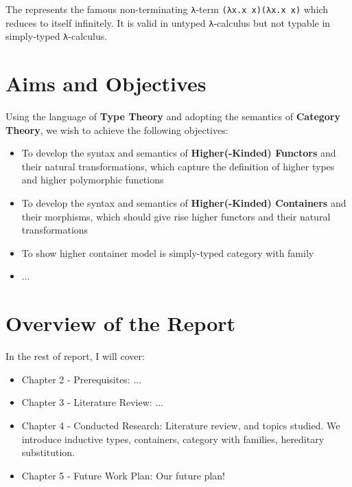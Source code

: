 The  represents the famous non-terminating \texttt{λ}-term \texttt{(λx.x x)(λx.x x)} which reduces to itself infinitely. It is valid in untyped \texttt{λ}-calculus but not typable in simply-typed \texttt{λ}-calculus. 

\section{Aims and Objectives}

Using the language of \textbf{Type Theory} and adopting the semantics of \textbf{Category Theory}, we wish to achieve the following objectives:

\begin{itemize}
  \item{To develop the syntax and semantics of \textbf{Higher(-Kinded) Functors} and their natural transformations, which capture the definition of higher types and higher polymorphic functions}
  \item{To develop the syntax and semantics of \textbf{Higher(-Kinded) Containers} and their morphisms, which should give rise higher functors and their natural transformations}
  \item{To show higher container model is simply-typed category with family}
  \item{...}
\end{itemize}

\section{Overview of the Report}

In the rest of report, I will cover:
\begin{itemize}
  \item{Chapter 2 - Prerequisites: ...}
  \item{Chapter 3 - Literature Review: ...}
  \item{Chapter 4 - Conducted Research: Literature review, and topics studied. We introduce inductive types, containers, category with families, hereditary substitution.}
  \item{Chapter 5 - Future Work Plan: Our future plan!}
\end{itemize}

